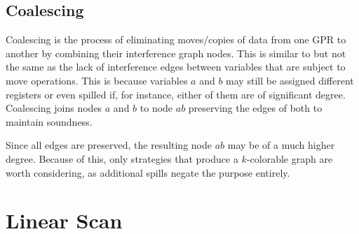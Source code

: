 \documentclass{article}
\begin{document}
\subsection{Coalescing}


Coalescing is the process of eliminating moves/copies of data from one GPR to another by combining their interference graph nodes.  This is similar to but  not the same as  the lack of interference edges between variables that are subject to move operations. This is because variables \(a\) and \(b\) may still be assigned different registers or even spilled if,  for instance, either of them are of significant degree. Coalescing joins nodes \(a\) and \(b\) to node \(ab\) preserving the edges of both to maintain soundness.

Since all edges are preserved, the resulting node \(ab\) may be of a much higher degree. Because of this, only strategies that produce a \(k\)-colorable graph are worth considering, as additional spills negate the purpose entirely.

\section{Linear Scan}






%
%
%
%
%
%
\end{document}

